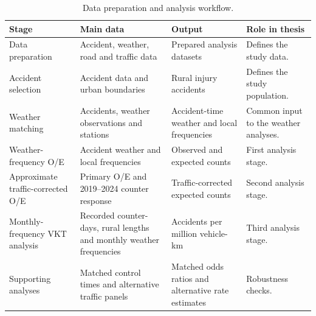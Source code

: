 \begin{table}[H]

\centering
\footnotesize
\setlength{\tabcolsep}{2.5pt}
\renewcommand{\arraystretch}{1.08}
\caption{Data preparation and analysis workflow.}
\label{tab:analysis-pipeline}
\begin{tabularx}{\textwidth}{L{0.16\textwidth}L{0.27\textwidth}L{0.27\textwidth}L{0.18\textwidth}}
\toprule
Stage & Main data & Output & Role in thesis \\
\midrule
Data preparation &
Accident, weather, road and traffic data &
Prepared analysis datasets &
Defines the study data. \\ \grayhline
Accident selection &
Accident data and urban boundaries &
Rural injury accidents &
Defines the study population. \\ \grayhline
Weather matching &
Accidents, weather observations and stations &
Accident-time weather and local frequencies &
Common input to the weather analyses. \\ \grayhline
Weather-frequency O/E &
Accident weather and local frequencies &
Observed and expected counts &
First analysis stage. \\ \grayhline
Approximate traffic-corrected O/E &
Primary O/E and 2019--2024 counter response &
Traffic-corrected expected counts &
Second analysis stage. \\ \grayhline
Monthly-frequency VKT analysis &
Recorded counter-days, rural lengths and monthly weather frequencies &
Accidents per million vehicle-km &
Third analysis stage. \\ \grayhline
Supporting analyses &
Matched control times and alternative traffic panels &
Matched odds ratios and alternative rate estimates &
Robustness checks. \\
\bottomrule
\end{tabularx}
\end{table}
